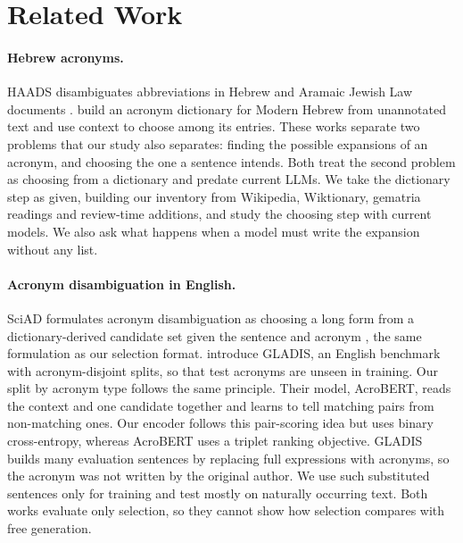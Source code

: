\section{Related Work}
\label{sec:related-work}
\paragraph{Hebrew acronyms.}
HAADS disambiguates abbreviations in Hebrew and Aramaic Jewish Law documents \citep{hacohenkerner2010haads}. \citet{jacobs2020acronyms} build an acronym dictionary for Modern Hebrew from unannotated text and use context to choose among its entries. These works separate two problems that our study also separates: finding the possible expansions of an acronym, and choosing the one a sentence intends. Both treat the second problem as choosing from a dictionary and predate current LLMs. We take the dictionary step as given, building our inventory from Wikipedia, Wiktionary, gematria readings and review-time additions, and study the choosing step with current models. We also ask what happens when a model must write the expansion without any list.

\paragraph{Acronym disambiguation in English.}
SciAD formulates acronym disambiguation as choosing a long form from a dictionary-derived candidate set given the sentence and acronym \citep{veyseh2020acronym}, the same formulation as our selection format. \citet{chen2023gladis} introduce GLADIS, an English benchmark with acronym-disjoint splits, so that test acronyms are unseen in training. Our split by acronym type follows the same principle. Their model, AcroBERT, reads the context and one candidate together and learns to tell matching pairs from non-matching ones. Our encoder follows this pair-scoring idea but uses binary cross-entropy, whereas AcroBERT uses a triplet ranking objective. GLADIS builds many evaluation sentences by replacing full expressions with acronyms, so the acronym was not written by the original author. We use such substituted sentences only for training and test mostly on naturally occurring text. Both works evaluate only selection, so they cannot show how selection compares with free generation.

